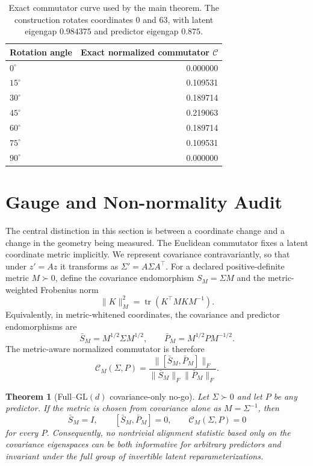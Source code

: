 \documentclass{article}
\DeclareMathOperator{\tr}{tr}
\newtheorem{supptheorem}{Theorem}
\begin{document}
\begin{table}[H]
\centering
\caption{Exact commutator curve used by the main theorem. The construction rotates coordinates $0$ and $63$, with latent eigengap $0.984375$ and predictor eigengap $0.875$.}
\label{tab:supp-exact}
\begin{tabular*}{0.62\linewidth}{@{\extracolsep{\fill}}lr@{}}
\toprule
Rotation angle & Exact normalized commutator $\mathcal C$ \\
\midrule
$0^\circ$ & 0.000000 \\
$15^\circ$ & 0.109531 \\
$30^\circ$ & 0.189714 \\
$45^\circ$ & 0.219063 \\
$60^\circ$ & 0.189714 \\
$75^\circ$ & 0.109531 \\
$90^\circ$ & 0.000000 \\
\bottomrule
\end{tabular*}
\end{table}

\section{Gauge and Non-normality Audit}
\label{sec:supp-gauge-nonnormality}

The central distinction in this section is between a coordinate change and a
change in the geometry being measured. The Euclidean commutator fixes a latent
coordinate metric implicitly.
We represent covariance contravariantly, so that under $z'=Az$ it transforms
as $\Sigma'=A\Sigma A^\top$. For a declared positive-definite metric
$M\succ0$, define the covariance endomorphism $S_M=\Sigma M$ and the
metric-weighted Frobenius norm
\begin{equation}
\label{eq:supp-metric-norm}
\|K\|_M^2=\tr(K^\top M K M^{-1}).
\end{equation}
Equivalently, in metric-whitened coordinates, the covariance and predictor
endomorphisms are
\begin{equation}
\label{eq:supp-metric-whitened-pair}
\bar S_M=M^{1/2}\Sigma M^{1/2},\qquad
\bar P_M=M^{1/2}PM^{-1/2}.
\end{equation}
The metric-aware normalized commutator is therefore
\begin{equation}
\label{eq:supp-metric-commutator}
\mathcal C_M(\Sigma,P)=
\frac{\|[\bar S_M,\bar P_M]\|_F}
{\|\bar S_M\|_F\|\bar P_M\|_F}.
\end{equation}
\begin{supptheorem}[Full--$\mathrm{GL}(d)$ covariance-only no-go]
\label{thm:supp-full-gl-no-go}
Let $\Sigma\succ0$ and let $P$ be any predictor. If the metric is chosen
from covariance alone as $M=\Sigma^{-1}$, then
\begin{equation}
\label{eq:supp-covariance-only-collapse}
\bar S_M=I,\qquad [\bar S_M,\bar P_M]=0,
\qquad \mathcal C_M(\Sigma,P)=0
\end{equation}
for every $P$. Consequently, no nontrivial alignment statistic based only on
the covariance eigenspaces can be both informative for arbitrary predictors
and invariant under the full group of invertible latent reparameterizations.
\end{supptheorem}
\end{document}
